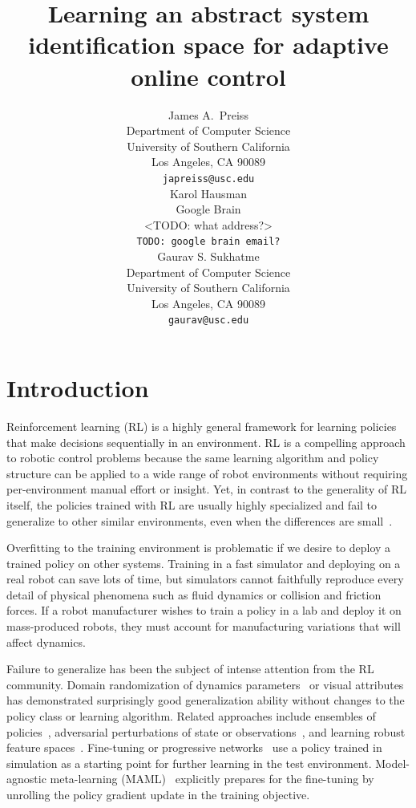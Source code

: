 \documentclass{article}
\title{Learning an abstract system identification space for adaptive online control}
\author{
  James A.~Preiss \\
  Department of Computer Science\\
  University of Southern California\\
  Los Angeles, CA 90089\\
  \texttt{japreiss@usc.edu} \\
  \And
  Karol Hausman \\
  Google Brain \\
  <TODO: what address?> \\
  \texttt{TODO: google brain email?} \\
  \AND
  Gaurav S. Sukhatme \\
  Department of Computer Science\\
  University of Southern California\\
  Los Angeles, CA 90089\\
  \texttt{gaurav@usc.edu} \\
}
\newcommand{\TODO}[1]{}
\begin{document}
\maketitle

\begin{abstract}
\end{abstract}

\section{Introduction}

Reinforcement learning (RL) is a highly general framework for learning policies that make decisions sequentially in an environment.
RL is a compelling approach to robotic control problems
because the same learning algorithm and policy structure can be applied to a wide range of robot environments
without requiring per-environment manual effort or insight.
Yet, in contrast to the generality of RL itself,
the policies trained with RL are usually highly specialized and fail to generalize to other similar environments,
even when the differences are small~\citep{zhang-study-on-overfitting}.

Overfitting to the training environment is problematic if we desire to deploy a trained policy on other systems.
Training in a fast simulator and deploying on a real robot can save lots of time,
but simulators cannot faithfully reproduce every detail of physical phenomena such as fluid dynamics or collision and friction forces.
If a robot manufacturer wishes to train a policy in a lab and deploy it on mass-produced robots,
they must account for manufacturing variations that will affect dynamics.

Failure to generalize has been the subject of intense attention from the RL community.
Domain randomization of dynamics parameters~\citep{antonova-pivoting-corr17, zhu-RL-IL-diverse}
or visual attributes~\citep{sadeghi-cad2rl-rss17,tobin-domainrand-arxiv17,james-domain-xfer}
has demonstrated surprisingly good generalization ability without changes to the policy class or learning algorithm.
Related approaches include ensembles of policies~\citep{actor-mimic,teh-distral},
adversarial perturbations of state or observations~\citep{pinto-robust-adversarial-RL,huang-adversarial-attacks},
and learning robust feature spaces~\citet{higgins-DARLA,bousmalis-domainseparation-nips16}.
Fine-tuning or progressive networks~\citet{rusu-progressive-nets} \TODO{fine-tuning citation}
use a policy trained in simulation as a starting point for further learning in the test environment.
Model-agnostic meta-learning (MAML)~\citep{finn-maml-icml17}
explicitly prepares for the fine-tuning by unrolling the policy gradient update in the training objective.
\TODO{end this paragraph.}
\end{document}
